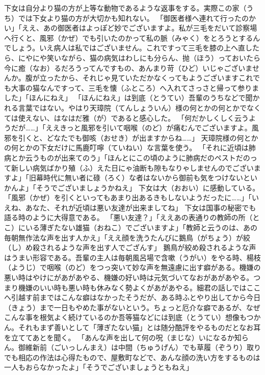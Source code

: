 \documentclass{book}
\begin{document}
下女は自分より猫の方が上等な動物であるような返事をする。実際この家（うち）では下女より猫の方が大切かも知れない。
「御医者様へ連れて行ったのかい」「ええ、あの御医者はよっぽど妙でございますよ。私が三毛をだいて診察場へ行くと、風邪（かぜ）でも引いたのかって私の脈（みゃく）をとろうとするんでしょう。いえ病人は私ではございません。これですって三毛を膝の上へ直したら、にやにや笑いながら、猫の病気はわしにも分らん、抛（ほう）っておいたら今に癒（なお）るだろうってんですもの、あんまり苛（ひど）いじゃございませんか。腹が立ったから、それじゃ見ていただかなくってもようございますこれでも大事の猫なんですって、三毛を懐（ふところ）へ入れてさっさと帰って参りました」「ほんにねえ」
「ほんにねえ」は到底（とうてい）吾輩のうちなどで聞かれる言葉ではない。やはり天璋院（てんしょういん）様の何とかの何とかでなくては使えない、はなはだ雅（が）であると感心した。
「何だかしくしく云うようだが\ldots{}\ldots{}」「ええきっと風邪を引いて咽喉（のど）が痛むんでございますよ。風邪を引くと、どなたでも御咳（おせき）が出ますからね\ldots{}\ldots{}」
天璋院様の何とかの何とかの下女だけに馬鹿叮嚀（ていねい）な言葉を使う。
「それに近頃は肺病とか云うものが出来てのう」「ほんとにこの頃のように肺病だのペストだのって新しい病気ばかり殖（ふ）えた日にゃ油断も隙もなりゃしませんのでございますよ」「旧幕時代に無い者に碌（ろく）な者はないから御前も気をつけないといかんよ」「そうでございましょうかねえ」
下女は大（おおい）に感動している。
「風邪（かぜ）を引くといってもあまり出あるきもしないようだったに\ldots{}\ldots{}」「いえね、あなた、それが近頃は悪い友達が出来ましてね」
下女は国事の秘密でも語る時のように大得意である。
「悪い友達？」「ええあの表通りの教師の所（とこ）にいる薄ぎたない雄猫（おねこ）でございますよ」「教師と云うのは、あの毎朝無作法な声を出す人かえ」「ええ顔を洗うたんびに鵝鳥（がちょう）が絞（し）め殺されるような声を出す人でござんす」
鵝鳥が絞め殺されるような声はうまい形容である。吾輩の主人は毎朝風呂場で含嗽（うがい）をやる時、楊枝（ようじ）で咽喉（のど）をつっ突いて妙な声を無遠慮に出す癖がある。機嫌の悪い時はやけにがあがあやる、機嫌の好い時は元気づいてなおがあがあやる。つまり機嫌のいい時も悪い時も休みなく勢よくがあがあやる。細君の話しではここへ引越す前まではこんな癖はなかったそうだが、ある時ふとやり出してから今日（きょう）まで一日もやめた事がないという。ちょっと厄介な癖であるが、なぜこんな事を根気よく続けているのか吾等猫などには到底（とうてい）想像もつかん。それもまず善いとして「薄ぎたない猫」とは随分酷評をやるものだとなお耳を立ててあとを聞く。
「あんな声を出して何の呪（まじな）いになるか知らん。御維新前（ごいっしんまえ）は中間（ちゅうげん）でも草履（ぞうり）取りでも相応の作法は心得たもので、屋敷町などで、あんな顔の洗い方をするものは一人もおらなかったよ」「そうでございましょうともねえ」
\end{document}
